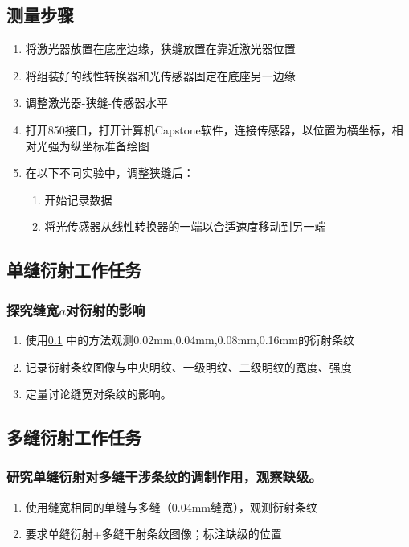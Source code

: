 \documentclass[a4paper]{../phyreport}
\begin{document}
\subsection{测量步骤}\label{测量步骤}
\begin{enumerate}
\item 将激光器放置在底座边缘，狭缝放置在靠近激光器位置
\item 将组装好的线性转换器和光传感器固定在底座另一边缘
\item 调整激光器-狭缝-传感器水平
\item 打开850接口，打开计算机Capstone软件，连接传感器，以位置为横坐标，相对光强为纵坐标准备绘图
\item 在以下不同实验中，调整狭缝后：
\begin{enumerate}
    \item 开始记录数据
    \item 将光传感器从线性转换器的一端以合适速度移动到另一端
\end{enumerate}
\end{enumerate}

\subsection{单缝衍射工作任务}

\subsubsection{探究缝宽$a$对衍射的影响}

\begin{enumerate}
    \item 使用\ref{测量步骤} 中的方法观测0.02mm,0.04mm,0.08mm,0.16mm的衍射条纹
    \item 记录衍射条纹图像与中央明纹、一级明纹、二级明纹的宽度、强度
    \item 定量讨论缝宽对条纹的影响。
\end{enumerate}

\subsection{多缝衍射工作任务}

\subsubsection{研究单缝衍射对多缝干涉条纹的调制作用，观察缺级。}

\begin{enumerate}
    \item 使用缝宽相同的单缝与多缝（0.04mm缝宽），观测衍射条纹
    \item 要求单缝衍射+多缝干射条纹图像；标注缺级的位置 
\end{enumerate}
\end{document}
